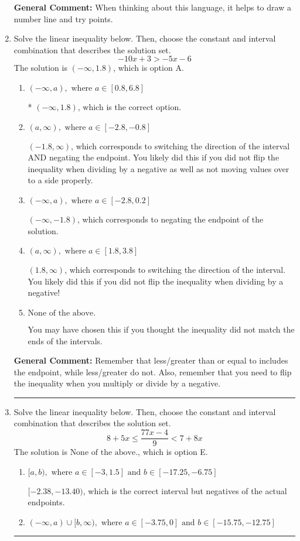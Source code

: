 \documentclass{extbook}[14pt]
\newcommand{\litem}[1]{\item #1

\rule{\textwidth}{0.4pt}}
\begin{document}
\begin{enumerate}
{\textbf{General Comment:} When thinking about this language, it helps to draw a number line and try points.
}
\litem{
Solve the linear inequality below. Then, choose the constant and interval combination that describes the solution set.
\[ -10x + 3 > -5x -6 \]The solution is \( (-\infty, 1.8) \), which is option A.\begin{enumerate}[label=\Alph*.]
\item \( (-\infty, a), \text{ where } a \in [0.8, 6.8] \)

* $(-\infty, 1.8)$, which is the correct option.
\item \( (a, \infty), \text{ where } a \in [-2.8, -0.8] \)

 $(-1.8, \infty)$, which corresponds to switching the direction of the interval AND negating the endpoint. You likely did this if you did not flip the inequality when dividing by a negative as well as not moving values over to a side properly.
\item \( (-\infty, a), \text{ where } a \in [-2.8, 0.2] \)

 $(-\infty, -1.8)$, which corresponds to negating the endpoint of the solution.
\item \( (a, \infty), \text{ where } a \in [1.8, 3.8] \)

 $(1.8, \infty)$, which corresponds to switching the direction of the interval. You likely did this if you did not flip the inequality when dividing by a negative!
\item \( \text{None of the above}. \)

You may have chosen this if you thought the inequality did not match the ends of the intervals.
\end{enumerate}

\textbf{General Comment:} Remember that less/greater than or equal to includes the endpoint, while less/greater do not. Also, remember that you need to flip the inequality when you multiply or divide by a negative.
}
\litem{
Solve the linear inequality below. Then, choose the constant and interval combination that describes the solution set.
\[ 8 + 5 x \leq \frac{77 x - 4}{9} < 7 + 8 x \]The solution is \( \text{None of the above.} \), which is option E.\begin{enumerate}[label=\Alph*.]
\item \( [a, b), \text{ where } a \in [-3, 1.5] \text{ and } b \in [-17.25, -6.75] \)

$[-2.38, -13.40)$, which is the correct interval but negatives of the actual endpoints.
\item \( (-\infty, a) \cup [b, \infty), \text{ where } a \in [-3.75, 0] \text{ and } b \in [-15.75, -12.75] \)


\end{enumerate}}
\end{enumerate}
\end{document}
